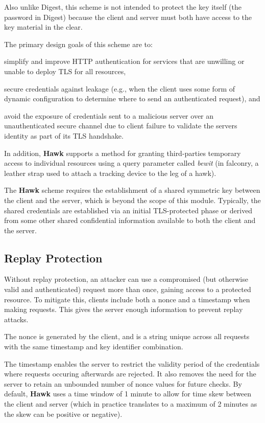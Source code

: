 Also unlike Digest, this scheme is not intended to protect the key itself (the password in Digest) because the client and server must both have access to the key material in the clear.

The primary design goals of this scheme are to\+:
\begin{DoxyItemize}
\item simplify and improve H\+T\+T\+P authentication for services that are unwilling or unable to deploy T\+L\+S for all resources,
\item secure credentials against leakage (e.\+g., when the client uses some form of dynamic configuration to determine where to send an authenticated request), and
\item avoid the exposure of credentials sent to a malicious server over an unauthenticated secure channel due to client failure to validate the server\textquotesingle{}s identity as part of its T\+L\+S handshake.
\end{DoxyItemize}

In addition, {\bfseries Hawk} supports a method for granting third-\/parties temporary access to individual resources using a query parameter called {\itshape bewit} (in falconry, a leather strap used to attach a tracking device to the leg of a hawk).

The {\bfseries Hawk} scheme requires the establishment of a shared symmetric key between the client and the server, which is beyond the scope of this module. Typically, the shared credentials are established via an initial T\+L\+S-\/protected phase or derived from some other shared confidential information available to both the client and the server.

\subsection*{Replay Protection}

Without replay protection, an attacker can use a compromised (but otherwise valid and authenticated) request more than once, gaining access to a protected resource. To mitigate this, clients include both a nonce and a timestamp when making requests. This gives the server enough information to prevent replay attacks.

The nonce is generated by the client, and is a string unique across all requests with the same timestamp and key identifier combination.

The timestamp enables the server to restrict the validity period of the credentials where requests occuring afterwards are rejected. It also removes the need for the server to retain an unbounded number of nonce values for future checks. By default, {\bfseries Hawk} uses a time window of 1 minute to allow for time skew between the client and server (which in practice translates to a maximum of 2 minutes as the skew can be positive or negative).

